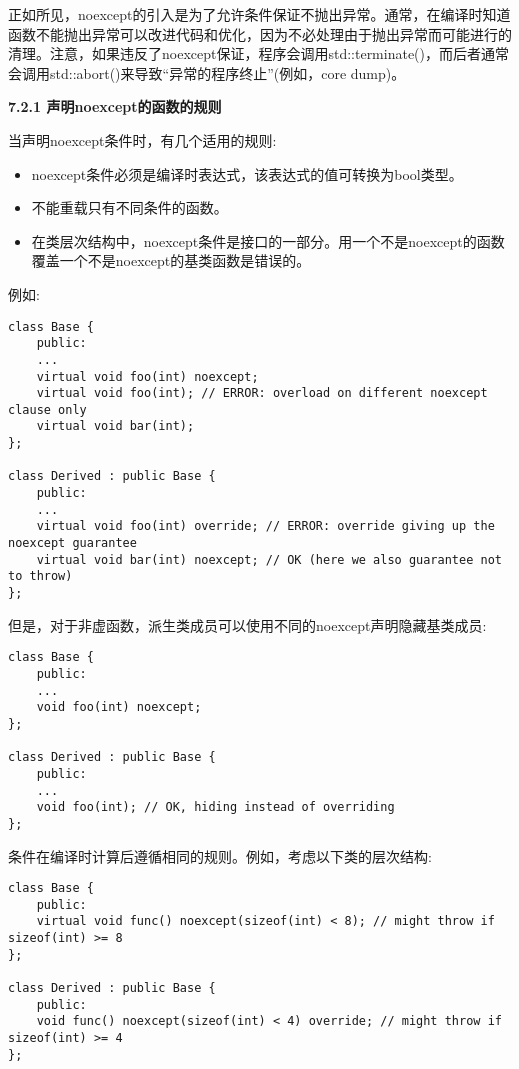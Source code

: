 正如所见，noexcept的引入是为了允许条件保证不抛出异常。通常，在编译时知道函数不能抛出异常可以改进代码和优化，因为不必处理由于抛出异常而可能进行的清理。注意，如果违反了noexcept保证，程序会调用std::terminate()，而后者通常会调用std::abort()来导致“异常的程序终止”(例如，core dump)。\par

\hspace*{\fill} \par %
\textbf{7.2.1 声明noexcept的函数的规则}

当声明noexcept条件时，有几个适用的规则:\par

\begin{itemize}
	\item noexcept条件必须是编译时表达式，该表达式的值可转换为bool类型。
	\item 不能重载只有不同条件的函数。
	\item 在类层次结构中，noexcept条件是接口的一部分。用一个不是noexcept的函数覆盖一个不是noexcept的基类函数是错误的。
\end{itemize}

例如:\par

\begin{lstlisting}[caption={}]
class Base {
	public:
	...
	virtual void foo(int) noexcept;
	virtual void foo(int); // ERROR: overload on different noexcept clause only
	virtual void bar(int);
};

class Derived : public Base {
	public:
	...
	virtual void foo(int) override; // ERROR: override giving up the noexcept guarantee
	virtual void bar(int) noexcept; // OK (here we also guarantee not to throw)
};
\end{lstlisting}

但是，对于非虚函数，派生类成员可以使用不同的noexcept声明隐藏基类成员:\par

\begin{lstlisting}[caption={}]
class Base {
	public:
	...
	void foo(int) noexcept;
};

class Derived : public Base {
	public:
	...
	void foo(int); // OK, hiding instead of overriding
};
\end{lstlisting}

条件在编译时计算后遵循相同的规则。例如，考虑以下类的层次结构:\par

\begin{lstlisting}[caption={}]
class Base {
	public:
	virtual void func() noexcept(sizeof(int) < 8); // might throw if sizeof(int) >= 8
};

class Derived : public Base {
	public:
	void func() noexcept(sizeof(int) < 4) override; // might throw if sizeof(int) >= 4
};
\end{lstlisting}

